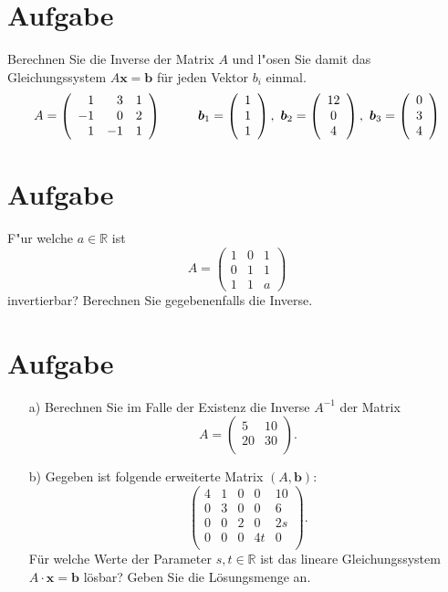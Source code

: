 \documentclass[fontsize=11pt, parskip=half]{scrartcl}
\newcommand{\R}{\mathbb{R}}
\newcommand{\three}[3]{\left(\begin{array}{c}#1\\#2\\#3\end{array}\right)}
\renewcommand{\vec}[1]{\boldsymbol #1}
\begin{document}
\section{Aufgabe} Berechnen Sie die Inverse der Matrix $A$ und l"osen Sie damit
das Gleichungssystem $A \vec{x}=\vec{b}$ für jeden Vektor $b_i$
einmal.
\[A= \left( \begin{array}{rrr} 1 & 3 & 1 \\
-1 & 0 & 2 \\ 1 & -1 & 1 \end{array} \right) \hspace{10mm}
\vec{b_1}=\three{1}{1}{1}, \ \vec{b_2}=\three{12}{0}{4}, \
\vec{b_3}=\three{0}{3}{4} \]




\section{Aufgabe} F"ur welche $a \in \R$ ist
\[ A= \left( \begin{array}{rrr} 1 & 0 & 1 \\
0 & 1 & 1 \\ 1 & 1 & a \end{array} \right) \] invertierbar?
Berechnen Sie gegebenenfalls die Inverse.




%

\section{Aufgabe}
\begin{enumerate}
\item [a)] Berechnen Sie im Falle der Existenz die Inverse $A^{-1}$ der Matrix
$$A=
\left(\begin{array}{cc}5& 10 \\20 & 30\\ \end{array}\right).
$$
\item [b)] Gegeben ist folgende erweiterte Matrix $(A,\vec{b})$:
$$
\left(\begin{array}{cccc|c}4& 1& 0& 0& 10\\0& 3& 0& 0& 6\\0& 0& 2& 0& 2s\\0& 0& 0& 4t& 0\\
\end{array}\right).
$$
Für welche Werte der Parameter $s,t \in \R$ ist das lineare
Gleichungssystem $A\cdot \vec{x}=\vec{b}$ lösbar? Geben Sie die
Lösungsmenge an.
\end{enumerate}
\end{document}

